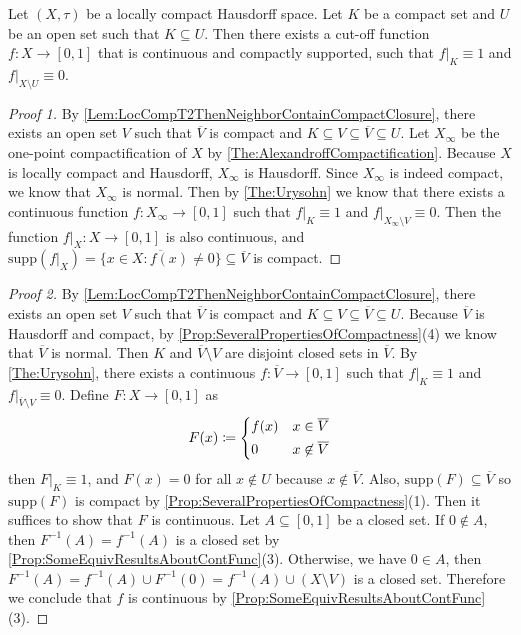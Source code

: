 \documentclass[screen,single]{techreport}
\numberwithin{equation}{section}
\begin{document}
\begin{theorem}\label{The:LocCompT2StrongerCutOff}
	Let $(X,\tau)$ be a locally compact Hausdorff space.
	Let $K$ be a compact set and $U$ be an open set such that $K \subseteq U$.
	Then there exists a cut-off function $f : X \to [0,1]$ that is continuous and compactly supported, such that $f|_K \equiv 1$ and $f|_{X \setminus U} \equiv 0$.
\end{theorem}
\begin{proof}[Proof 1]
	By \cref{Lem:LocCompT2ThenNeighborContainCompactClosure}, there exists an open set $V$ such that $\overline{V}$ is compact and $K \subseteq V \subseteq \overline{V} \subseteq U$.
	Let $X_\infty$ be the one-point compactification of $X$ by \cref{The:AlexandroffCompactification}.
	Because $X$ is locally compact and Hausdorff, $X_\infty$ is Hausdorff.
	Since $X_\infty$ is indeed compact, we know that $X_\infty$ is normal.
	Then by \cref{The:Urysohn} we know that there exists a continuous function $f : X_\infty \to [0,1]$ such that $f|_K \equiv 1$ and $f |_{X_\infty \setminus V } \equiv 0$.
	Then the function $f|_X : X \to [0,1]$ is also continuous, and $\mathrm{supp}(f|_X) = \overline{\{x \in X: f(x) \neq 0\}} \subseteq \overline{V}$ is compact.
\end{proof}
\begin{proof}[Proof 2]
	By \cref{Lem:LocCompT2ThenNeighborContainCompactClosure}, there exists an open set $V$ such that $\overline{V}$ is compact and $K \subseteq V \subseteq \overline{V} \subseteq U$.
	Because $\overline{V}$ is Hausdorff and compact, by \cref{Prop:SeveralPropertiesOfCompactness}(4) we know that $\overline{V}$ is normal.
	Then $K$ and $\overline{V} \setminus V$ are disjoint closed sets in $\overline{V}$.
	By \cref{The:Urysohn}, there exists a continuous $f : \overline{V} \to [0,1]$ such that $f|_K \equiv 1$ and $f|_{\overline{V} \setminus V} \equiv 0$.
	Define $F : X \to [0,1]$ as
	\[
	F(x) \coloneqq \begin{dcases}
 		f(x) & x \in \overline{V} \\
 		0 & x \not\in \overline{V}
 	\end{dcases}
	\]
	then $F|_K \equiv 1$, and $F(x) = 0$ for all $x \not\in U$ because $x \not\in \overline{V}$.
	Also, $\mathrm{supp}(F) \subseteq \overline{V}$ so $\mathrm{supp}(F)$ is compact by \cref{Prop:SeveralPropertiesOfCompactness}(1).
	Then it suffices to show that $F$ is continuous.
	Let $A \subseteq [0,1]$ be a closed set.
	If $0 \not\in A$, then $F^{-1}(A) = f^{-1}(A)$ is a closed set by \cref{Prop:SomeEquivResultsAboutContFunc}(3).
	Otherwise, we have $0 \in A$, then $F^{-1}(A) = f^{-1}(A) \cup F^{-1}(0) = f^{-1}(A) \cup (X \setminus V)$ is a closed set.
	Therefore we conclude that $f$ is continuous by \cref{Prop:SomeEquivResultsAboutContFunc}(3).
\end{proof}
\end{document}
